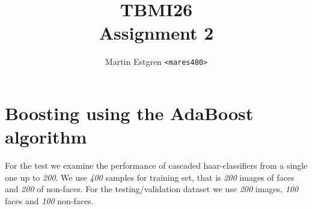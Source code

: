\documentclass[a4paper,12pt]{article}
\title{TBMI26  \\
       Assignment 2}
\author{Martin Estgren \texttt{<mares480>}}
\begin{document}
    \maketitle %

\section{Boosting using the AdaBoost algorithm}

For the test we examine the performance of cascaded haar-classifiers from a single one up to \textit{200}. We use \textit{400} samples for training set, that is \textit{200} images of faces and \textit{200} of non-faces. For the testing/validation dataset we use \textit{200} images, \textit{100} faces and \textit{100} non-faces. 
\end{document}
